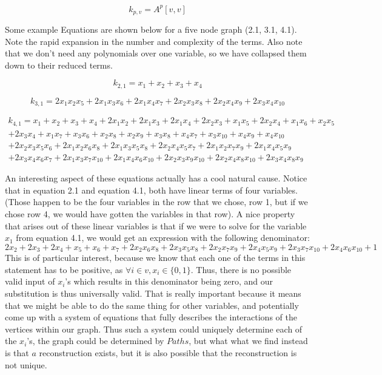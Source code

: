 \documentclass[11pt,a4paper]{report}
\begin{document}
$$k_{p, v} = A^p[v,v]$$

Some example Equations are shown below for a five node graph (2.1, 3.1, 4.1). 
Note the rapid expansion in the number and complexity of the terms.  
Also note that we don't need any polynomials over one variable, so we have collapsed them down to their reduced terms.

$$k_{2,1} = x_1 + x_2 + x_3 + x_4$$

$$k_{3,1} = 2x_1x_2x_5 + 2x_1x_3x_6 + 2x_1x_4x_7 + 2x_2x_3x_8 + 2x_2x_4x_9 + 2x_3x_4x_{10}$$

\begin{equation}\begin{aligned} k_{4,1} = x_1 + x_2 + x_3 + x_4 + 2x_1x_2 + 2x_1x_3 + 2x_1x_4 + 2x_2x_3 + x_1x_5 + 2x_2x_4 + x_1x_6 + x_2x_5 \\ + 2x_3x_4 + x_1x_7 + x_3x_6 + x_2x_8 + x_2x_9 + x_3x_8 + x_4x_7 + x_3x_{10} + x_4x_9 + x_4x_{10} \\ + 2x_2x_3x_5x_6 + 2x_1x_2x_6x_8 + 2x_1x_3x_5x_8 + 2x_2x_4x_5x_7 + 2x_1x_2x_7x_9 + 2x_1x_4x_5x_9 \\+ 2x_3x_4x_6x_7 + 2x_1x_3x_7x_{10} + 2x_1x_4x_6x_{10} + 2x_2x_3x_9x_{10} + 2x_2x_4x_8x_{10} + 2x_3x_4x_8x_9 \end{aligned}\end{equation}

An interesting aspect of these equations actually has a cool natural cause.  
Notice that in equation 2.1 and equation 4.1, both have linear terms of four variables.  
(Those happen to be the four variables in the row that we chose, row 1, but if we chose row 4, we would have gotten the variables in that row). 
A nice property that arises out of these linear variables is that if we were to solve for the variable $x_1$ from equation 4.1, we would get an expression with the following denominator: 
$$2x_2 + 2x_3 + 2x_4 + x_5 + x_6 + x_7 + 2x_2x_6x_8 + 2x_3x_5x_8 + 2x_2x_7x_9 + 2x_4x_5x_9 + 2x_3x_7x_{10} + 2x_4x_6x_{10} + 1$$
This is of particular interest, because we know that each one of the terms in this statement has to be positive, as $\forall i \in v,  x_i \in \{0, 1\}$.  
Thus, there is no possible valid input of $x_i$'s which results in this denominator being zero, and our substitution is thus universally valid.  
That is really important because it means that we might be able to do the same thing for other variables, and potentially come up with a system of equations that fully describes the interactions of the vertices within our graph. 
Thus such a system could uniquely determine each of the $x_i$'s, the graph could be determined by $Paths$, but what what we find instead is that $a$ reconstruction exists, but it is also possible that the reconstruction is not unique.
\end{document}
